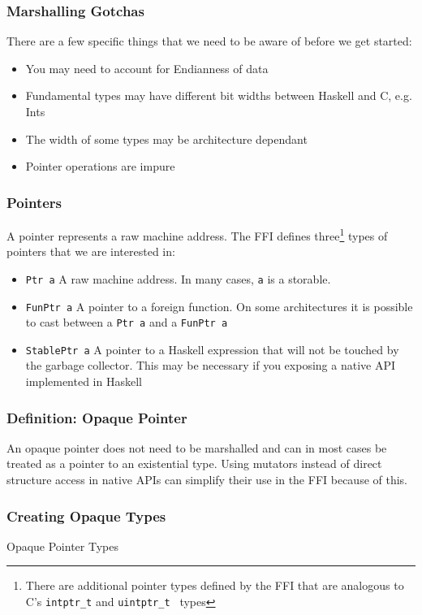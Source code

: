 \documentclass{beamer}
\begin{document}
\begin{frame}
    \frametitle{Marshalling Gotchas}
    There are a few specific things that we need to be aware of before we get
    started:
    \begin{itemize}
        \item{You may need to account for Endianness of data}
        \item{Fundamental types may have different bit widths between Haskell
            and C, e.g. Ints}
        \item{The width of some types may be architecture dependant}
        \item{Pointer operations are impure}
    \end{itemize}
\end{frame}
\begin{frame}
    \frametitle{Pointers}
    A pointer represents a raw machine address.  The FFI defines
    three\footnote{There are additional pointer types defined by
        the FFI that are analogous to C's {\tt intptr\_t} and {\tt uintptr\_t
    } types} types of
    pointers that we are interested in:
    \begin{itemize}
        \item{{\tt Ptr a} A raw machine address.  In many cases, {\tt a} is a
            storable.}
        \item{{\tt FunPtr a} A pointer to a foreign function.  On some
                architectures it is possible to cast between a {\tt Ptr a} and
            a {\tt FunPtr a}}
        \item{{\tt StablePtr a} A pointer to a Haskell expression that will not
                be touched by the garbage collector.  This may be necessary if
            you exposing a native API implemented in Haskell}
    \end{itemize}
\end{frame}
\begin{frame}
    \frametitle{Definition: Opaque Pointer}
    An opaque pointer does not need to be marshalled and can in most cases be
    treated as a pointer to an existential type.  Using mutators instead of
    direct structure access in native APIs can simplify their use in the FFI
    because of this.
\end{frame}
\begin{frame}[fragile]
    \frametitle{Creating Opaque Types}

    \begin{exampleblock}{Opaque Pointer Types}
        
    \end{exampleblock}
\end{frame}
\end{document}
